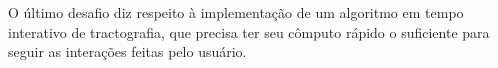 \documentclass[
    12pt,                %
    oneside,            %
    a4paper,            %
    english,            %
    french,                %
    spanish,            %
    brazil                %
    ]{abntex2}
\begin{document}
O último desafio diz respeito à implementação de um algoritmo em tempo interativo de tractografia, que precisa ter seu cômputo rápido o suficiente para seguir as interações feitas pelo usuário.






%
%
%


\end{document}
